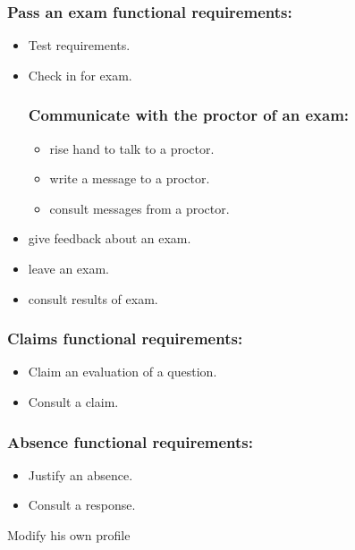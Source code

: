 \documentclass[a4paper,12p]{article}
\begin{document}
     \subsubsection{Pass an exam functional requirements:}
     \begin{itemize}
         \item Test requirements.
         \item Check in for exam.
         \subsubsection{Communicate with the proctor of an exam:}
         \begin{itemize}
             \item rise hand to talk to a proctor.
             \item write a message to a proctor.
             \item consult messages from a proctor.
         \end{itemize}

         \item give feedback about an exam.
         \item leave an exam.
         \item consult results of exam.
     \end{itemize}

     \subsubsection{Claims functional requirements:}
     \begin{itemize}
        \item Claim an evaluation of a question.
        \item Consult a claim.
     \end{itemize}

     \subsubsection{Absence functional requirements:}
     \begin{itemize}
         \item Justify an absence.
         \item Consult a response.
     \end{itemize}

     \item Modify his own profile
\end{document}
